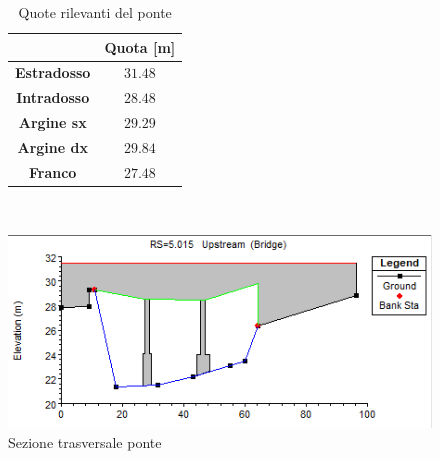 \documentclass[12pt]{article} %
\begin{document}
\begin{figure}[H]
\begin{minipage}[b]{6cm}
\centering
    \begin{table}[H]
    \centering
    \begin{tabular}{|c|c|}
        \hline
          & \textbf{Quota [m]}\\
          \hline
        \textbf{Estradosso} & $31.48$\\
        \textbf{Intradosso} & $28.48$\\
        \textbf{Argine sx} & $29.29$\\
        \textbf{Argine dx} & $29.84$\\
        \textbf{Franco} & $27.48$\\
        \hline
    \end{tabular}
    \caption{Quote rilevanti del ponte}
    \end{table}
\end{minipage}
\ \hspace{2mm} \hspace{3mm} \
\begin{minipage}[b]{13cm}
    \centering
    \includegraphics[scale=0.95]{UPBridge.PNG}
    \caption{Sezione trasversale ponte}
\end{minipage}
\end{figure}

%        
\end{document}
